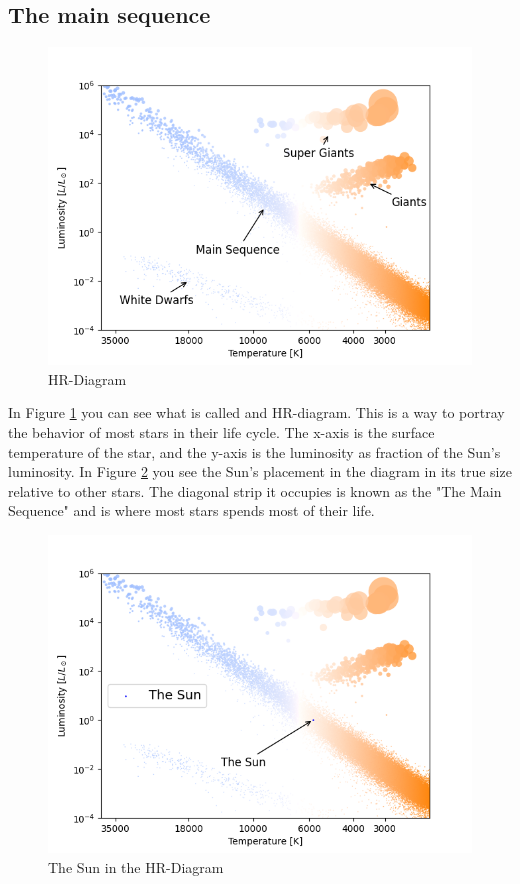 \documentclass[reprint,english,notitlepage]{revtex4-2}
\begin{document}
\subsection{The main sequence}
\begin{figure}[h!]
  \centering
  \includegraphics[scale = .50]{figures/HR-Diagram_Classification}
  \caption{HR-Diagram}
  \label{fig: HR_diagram}
\end{figure}
In Figure \ref{fig: HR_diagram} you can see what is called and HR-diagram. This is a way to portray the behavior of most stars in their life cycle. The x-axis is the surface temperature of the star, and the y-axis is the luminosity as fraction of the Sun's luminosity. In Figure \ref{fig: HR_diagram_The_Sun} you see the Sun's placement in the diagram in its true size relative to other stars. The diagonal strip it occupies is known as the "The Main Sequence" and is where most stars spends most of their life. 

\begin{figure}[h!]
  \centering
  \includegraphics[scale = .5]{figures/HR_diagram_The Sun}
  \caption{The Sun in the HR-Diagram}
  \label{fig: HR_diagram_The_Sun}
\end{figure}
\end{document}
